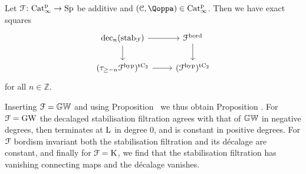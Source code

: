 \begin{proposition}
Let $\mathcal F \colon \mathrm{Cat}^{\mathrm p}_\infty \rightarrow \mathrm{Sp}$ be additive and $(\C,\QF) \in \Catp$. Then we have exact squares
\[
\begin{tikzcd}
\dec_n(\mathrm{stab}_\mathcal F) \ar[r] \ar[d] & \F^\bord \ar[d] \\
(\tau_{\geq -n} \F^\hyp)^\tC \ar[r] & (\F^\hyp)^\tC
\end{tikzcd}
\]
for all $n \in \mathbb Z$.
\end{proposition}

Inserting $\mathcal{F} = \mathbb{GW}$ and using Proposition~ we thus obtain Proposition . %
For $\mathcal{F} = \operatorname{GW}$ the decalaged stabilisation filtration
agrees with that of $\mathbb{GW}$ %
in negative degrees, %
then terminates at $\operatorname L$ in degree $0$, and is constant in positive degrees.
For $\mathcal{F}$ bordism invariant both the stabilisation filtration and its décalage are constant, and finally for $\mathcal{F} = \operatorname K$, we find that the stabilisation filtration has vanishing connecting maps and the décalage vanishes.
